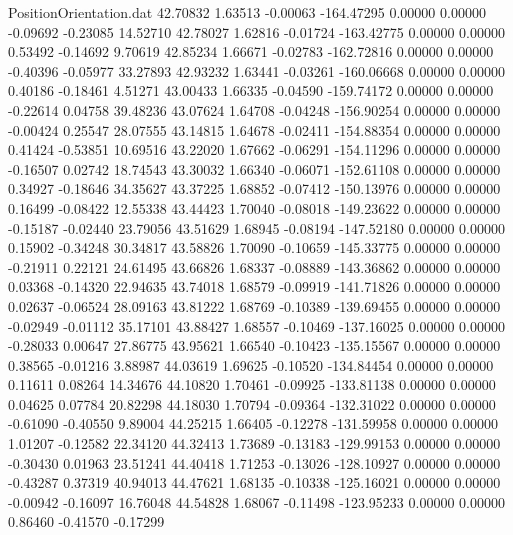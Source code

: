 \begin{filecontents}{PositionOrientation.dat}
  42.70832    1.63513   -0.00063  -164.47295    0.00000    0.00000   -0.09692   -0.23085   14.52710
  42.78027    1.62816   -0.01724  -163.42775    0.00000    0.00000    0.53492   -0.14692    9.70619
  42.85234    1.66671   -0.02783  -162.72816    0.00000    0.00000   -0.40396   -0.05977   33.27893
  42.93232    1.63441   -0.03261  -160.06668    0.00000    0.00000    0.40186   -0.18461    4.51271
  43.00433    1.66335   -0.04590  -159.74172    0.00000    0.00000   -0.22614    0.04758   39.48236
  43.07624    1.64708   -0.04248  -156.90254    0.00000    0.00000   -0.00424    0.25547   28.07555
  43.14815    1.64678   -0.02411  -154.88354    0.00000    0.00000    0.41424   -0.53851   10.69516
  43.22020    1.67662   -0.06291  -154.11296    0.00000    0.00000   -0.16507    0.02742   18.74543
  43.30032    1.66340   -0.06071  -152.61108    0.00000    0.00000    0.34927   -0.18646   34.35627
  43.37225    1.68852   -0.07412  -150.13976    0.00000    0.00000    0.16499   -0.08422   12.55338
  43.44423    1.70040   -0.08018  -149.23622    0.00000    0.00000   -0.15187   -0.02440   23.79056
  43.51629    1.68945   -0.08194  -147.52180    0.00000    0.00000    0.15902   -0.34248   30.34817
  43.58826    1.70090   -0.10659  -145.33775    0.00000    0.00000   -0.21911    0.22121   24.61495
  43.66826    1.68337   -0.08889  -143.36862    0.00000    0.00000    0.03368   -0.14320   22.94635
  43.74018    1.68579   -0.09919  -141.71826    0.00000    0.00000    0.02637   -0.06524   28.09163
  43.81222    1.68769   -0.10389  -139.69455    0.00000    0.00000   -0.02949   -0.01112   35.17101
  43.88427    1.68557   -0.10469  -137.16025    0.00000    0.00000   -0.28033    0.00647   27.86775
  43.95621    1.66540   -0.10423  -135.15567    0.00000    0.00000    0.38565   -0.01216    3.88987
  44.03619    1.69625   -0.10520  -134.84454    0.00000    0.00000    0.11611    0.08264   14.34676
  44.10820    1.70461   -0.09925  -133.81138    0.00000    0.00000    0.04625    0.07784   20.82298
  44.18030    1.70794   -0.09364  -132.31022    0.00000    0.00000   -0.61090   -0.40550    9.89004
  44.25215    1.66405   -0.12278  -131.59958    0.00000    0.00000    1.01207   -0.12582   22.34120
  44.32413    1.73689   -0.13183  -129.99153    0.00000    0.00000   -0.30430    0.01963   23.51241
  44.40418    1.71253   -0.13026  -128.10927    0.00000    0.00000   -0.43287    0.37319   40.94013
  44.47621    1.68135   -0.10338  -125.16021    0.00000    0.00000   -0.00942   -0.16097   16.76048
  44.54828    1.68067   -0.11498  -123.95233    0.00000    0.00000    0.86460   -0.41570   -0.17299

\end{filecontents}
